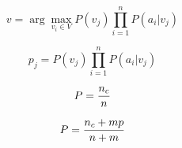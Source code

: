 
\Large

$$ v = \arg\max_{v_i\in V} P(v_j)\prod_{i=1}^n P(a_i|v_j)  $$

$$ p_j = P(v_j) \prod_{i=1}^n P(a_i|v_j) $$

$$ P = {n_c \over n} $$

$$ P = {n_c + m p \over n + m} $$ 



